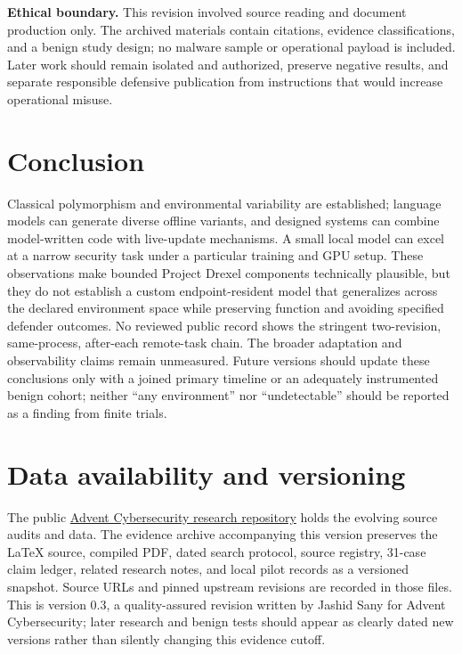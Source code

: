 \documentclass[11pt,letterpaper]{article}
\begin{document}
\textbf{Ethical boundary.} This revision involved source reading and document production only. The archived materials contain citations, evidence classifications, and a benign study design; no malware sample or operational payload is included. Later work should remain isolated and authorized, preserve negative results, and separate responsible defensive publication from instructions that would increase operational misuse.

\section{Conclusion}\label{sec:conclusion}

Classical polymorphism and environmental variability are established; language models can generate diverse offline variants, and designed systems can combine model-written code with live-update mechanisms. A small local model can excel at a narrow security task under a particular training and GPU setup. These observations make bounded Project Drexel components technically plausible, but they do not establish a custom endpoint-resident model that generalizes across the declared environment space while preserving function and avoiding specified defender outcomes. No reviewed public record shows the stringent two-revision, same-process, after-each remote-task chain. The broader adaptation and observability claims remain unmeasured. Future versions should update these conclusions only with a joined primary timeline or an adequately instrumented benign cohort; neither ``any environment'' nor ``undetectable'' should be reported as a finding from finite trials.

\section*{Data availability and versioning}

The public \href{https://github.com/Advent-Cybersecurity/advent-drexel}{Advent Cybersecurity research repository} holds the evolving source audits and data. The evidence archive accompanying this version preserves the LaTeX source, compiled PDF, dated search protocol, source registry, 31-case claim ledger, related research notes, and local pilot records as a versioned snapshot. Source URLs and pinned upstream revisions are recorded in those files. This is version 0.3, a quality-assured revision written by Jashid Sany for Advent Cybersecurity; later research and benign tests should appear as clearly dated new versions rather than silently changing this evidence cutoff.
\end{document}
